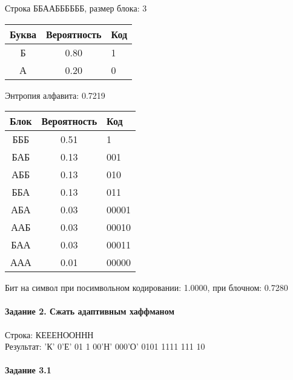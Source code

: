 \documentclass[a4paper, 12pt]{article}
\begin{document}
Строка ББААББББББ, размер блока: 3
\begin{center}
 \begin{tabular}{ |c|c|l| } 
  \hline
     Буква & Вероятность & Код\\ \hline
Б & 0.80 & 1\\\hline
А & 0.20 & 0
\\ \hline \end{tabular}
\end{center}
Энтропия алфавита: 0.7219
\begin{center}
 \begin{tabular}{ |c|c|l| } 
  \hline
     Блок & Вероятность & Код\\ \hline
БББ & 0.51 & 1\\\hline
БАБ & 0.13 & 001\\\hline
АББ & 0.13 & 010\\\hline
ББА & 0.13 & 011\\\hline
АБА & 0.03 & 00001\\\hline
ААБ & 0.03 & 00010\\\hline
БАА & 0.03 & 00011\\\hline
ААА & 0.01 & 00000
\\ \hline \end{tabular}
\end{center}
Бит на символ при посимвольном кодировании: 1.0000, при блочном: 0.7280


\pagebreak
\paragraph{Задание 2. Сжать адаптивным хаффманом\\}

Строка: 
КЕЕЕНООННН\\
Результат: 'К' 0'Е' 01 1 00'Н' 000'О' 0101 1111 111 10










\pagebreak
\paragraph{Задание 3.1}
\end{document}
